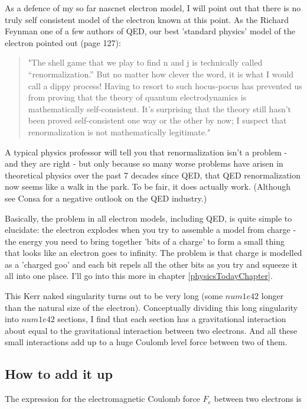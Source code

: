\documentclass[../rzero]{subfiles}
\begin{document}
As a defence of my so far nascnet electron model, I will point out that there is no truly self consistent model of the electron known at this point. As the Richard Feynman one of a few authors of QED, our best 'standard physics' model of the electron pointed out\cite{Feynman1985} (page 127): 

\begin{quotation}
"The shell game that we play to find n and j is technically called “renormalization.” But no matter how clever the word, it is what I would call a dippy process! Having to resort to such hocus-pocus has prevented us from proving that the theory of quantum electrodynamics is mathematically self-consistent. It’s surprising that the theory still hasn’t been proved self-consistent one way or the other by now; I suspect that renormalization is not mathematically legitimate." 
\end{quotation}

A typical physics professor will tell you that renormalization isn't a problem - and they are right - but only because so many worse problems have arisen in theoretical physics over the past 7 decades since QED, that QED renormalization now seems like a walk in the park. To be fair, it does actually work. (Although see Consa\cite{Cioletti2006} for a negative outlook on the QED industry.)

Basically, the problem in all electron models, including QED, is quite simple to elucidate: the electron explodes when you try to assemble a model from charge - the energy you need to bring together 'bits of a charge' to form a small thing that looks like an electron goes to infinity. The problem is that charge is modelled as a 'charged goo' and each bit repels all the other bits as you try and squeeze it all into one place. I'll go into this more in chapter \ref{physicsTodayChapter}.  

This Kerr naked singularity turns out to be very long (some $num{1e42}$ longer than the natural size of the electron). Conceptually dividing this long singularity into  $num{1e42}$ sections, I find that each section has a gravitational interaction about equal to the gravitational interaction between two electrons. And all these small interactions add up to a huge Coulomb level force between two of them.  

\subsection{How to add it up}
The expression for the electromagnetic Coulomb force $F_e$ between two electrons is 
\end{document}
